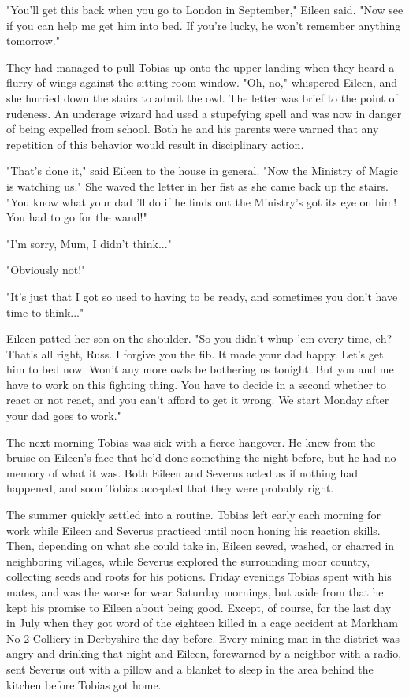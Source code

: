 \documentclass[a4paper,11pt]{article}
\begin{document}
"You'll get this back when you go to London in September," Eileen said. "Now see if you can help me get him into bed. If you're lucky, he won't remember anything tomorrow."

They had managed to pull Tobias up onto the upper landing when they heard a flurry of wings against the sitting room window. "Oh, no," whispered Eileen, and she hurried down the stairs to admit the owl. The letter was brief to the point of rudeness. An underage wizard had used a stupefying spell and was now in danger of being expelled from school. Both he and his parents were warned that any repetition of this behavior would result in disciplinary action.

"That's done it," said Eileen to the house in general. "Now the Ministry of Magic is watching us." She waved the letter in her fist as she came back up the stairs. "You know what your dad 'll do if he finds out the Ministry's got its eye on him! You had to go for the wand!"

"I'm sorry, Mum, I didn't think..."

"Obviously not!"

"It's just that I got so used to having to be ready, and sometimes you don't have time to think..."

Eileen patted her son on the shoulder. "So you didn't whup 'em every time, eh? That's all right, Russ. I forgive you the fib. It made your dad happy. Let's get him to bed now. Won't any more owls be bothering us tonight. But you and me have to work on this fighting thing. You have to decide in a second whether to react or not react, and you can't afford to get it wrong. We start Monday after your dad goes to work."

The next morning Tobias was sick with a fierce hangover. He knew from the bruise on Eileen's face that he'd done something the night before, but he had no memory of what it was. Both Eileen and Severus acted as if nothing had happened, and soon Tobias accepted that they were probably right.

The summer quickly settled into a routine. Tobias left early each morning for work while Eileen and Severus practiced until noon honing his reaction skills. Then, depending on what she could take in, Eileen sewed, washed, or charred in neighboring villages, while Severus explored the surrounding moor country, collecting seeds and roots for his potions. Friday evenings Tobias spent with his mates, and was the worse for wear Saturday mornings, but aside from that he kept his promise to Eileen about being good. Except, of course, for the last day in July when they got word of the eighteen killed in a cage accident at Markham No 2 Colliery in Derbyshire the day before. Every mining man in the district was angry and drinking that night and Eileen, forewarned by a neighbor with a radio, sent Severus out with a pillow and a blanket to sleep in the area behind the kitchen before Tobias got home.
\end{document}
